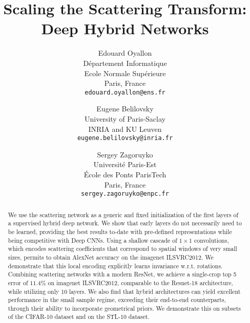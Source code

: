\documentclass[10pt,twocolumn,letterpaper]{article}
\begin{document}
\title{Scaling the Scattering Transform: Deep Hybrid Networks}

\author{Edouard Oyallon\\
D\'epartement Informatique\\
Ecole Normale Sup\'erieure\\
Paris, France\\
{\tt\small edouard.oyallon@ens.fr}
\and
Eugene Belilovsky\\
University of Paris-Saclay\\ INRIA
and KU Leuven\\
{\tt\small eugene.belilovsky@inria.fr}
\and
Sergey Zagoruyko\\
 Universit\'e Paris-Est\\
  \'Ecole des Ponts ParisTech\\
 Paris, France\\
{\tt\small sergey.zagoruyko@enpc.fr}
}

\maketitle




\begin{abstract}






We use the scattering network as a generic and fixed initialization of the first layers of a supervised hybrid deep network. We show that early layers do not necessarily need to be learned, providing the best results to-date with pre-defined representations while being competitive with Deep CNNs. Using a shallow cascade of $1\times1$ convolutions, which encodes scattering coefficients that correspond to spatial windows of very small sizes, permits to obtain AlexNet accuracy on the imagenet ILSVRC2012. We demonstrate that this local encoding explicitly learns invariance w.r.t. rotations. Combining scattering networks with a modern ResNet, we achieve a single-crop top 5 error of $11.4\%$ on imagenet ILSVRC2012, comparable to the Resnet-18 architecture, while utilizing only 10 layers. We also find that hybrid architectures can yield excellent performance in the small sample regime, exceeding their end-to-end counterparts, through their ability to incorporate geometrical priors. We demonstrate this on subsets of the CIFAR-10 dataset and on the STL-10 dataset. 

\end{abstract}
\end{document}
